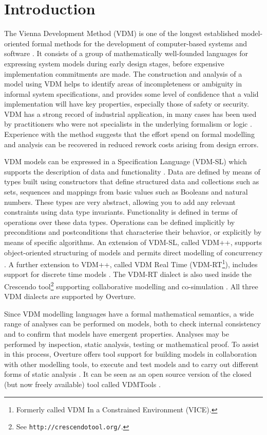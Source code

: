 \documentclass{overturerepchap}
\newcommand{\url}[1]{\texttt{#1}}
\begin{document}
\chapter{Introduction}

The Vienna Development Method (VDM) is one of the longest established
model-oriented formal methods for the development of computer-based
systems and software
\cite{Bjorner&78,Jones90a,Fitzgerald&08c}. It consists of a
group of mathematically well-founded languages for expressing system
models during early design stages, before expensive implementation
commitments are made. The construction and analysis of a model using
VDM helps to identify areas of incompleteness or ambiguity in
informal system specifications, and provides some level of confidence
that a valid implementation will have key properties, especially those
of safety or security. VDM has a strong record of industrial
application, in many cases has been used
by practitioners who were not specialists in
the underlying formalism or logic
\cite{Larsen&96b,Clement&99,Kurita&09}. Experience with the method
suggests that the effort spend on formal modelling and analysis can
be recovered in reduced rework costs arising from design errors.

VDM models can be expressed in a Specification Language (VDM-SL) which
supports the description of data and functionality
\cite{ISOVDM96a,Fitzgerald&98b,Fitzgerald&09}. Data are defined by
means of types built using constructors that define structured data
and collections such as sets, sequences and mappings from basic values
such as Booleans and natural numbers. These types are very abstract,
allowing you to add any relevant constraints using data type
invariants. Functionality is defined in terms of operations over these
data types. Operations can be defined implicitly by preconditions and
postconditions that characterise their behavior, or explicitly by
means of specific algorithms. An extension of VDM-SL, called VDM++,
supports object-oriented structuring of models and permits direct
modelling of concurrency \cite{Fitzgerald&05}. A further extension
to VDM++, called VDM Real Time (VDM-RT\footnote{Formerly called VDM In a
Constrained Environment (VICE).}), includes support for discrete
time models \cite{Mukherjee&00,Verhoef&06b}. The VDM-RT dialect is also used inside 
the Crescendo tool\footnote{See \url{http://crescendotool.org/}.} supporting collaborative modelling and co-simulation \cite{Fitzgerald&14c}. All
three VDM dialects are supported by Overture.

Since VDM modelling languages have a formal mathematical semantics,
a wide range of ana\-ly\-ses can be performed on models, both to check
internal consistency and to confirm that models have emergent
properties. Analyses may be performed by inspection, static analysis,
testing or mathematical proof. To assist in this process, Overture
offers tool support for building models in collaboration with other
modelling tools, to execute and test models and to carry out different
forms of static analysis \cite{Larsen&13b}. It can be seen as an open
source version of the closed (but now freely available) tool called VDMTools
\cite{Elmstrom&94,Larsen01,Fitzgerald&08a}.
\end{document}
